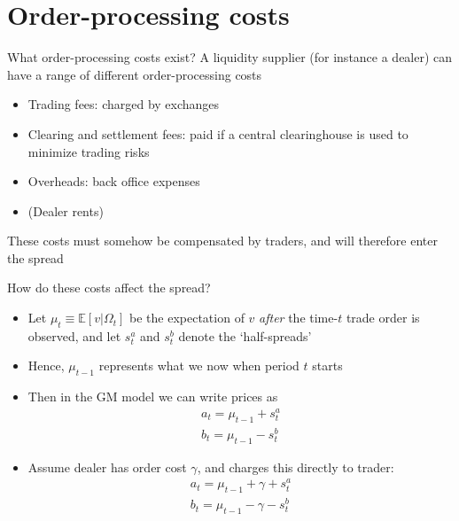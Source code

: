 \documentclass[english,10pt]{beamer}
\begin{document}
\section{Order-processing costs}

\begin{frame}{What order-processing costs exist?}
	A liquidity supplier (for instance a dealer) can have a range of different order-processing costs
	\begin{itemize}
		\item Trading fees:  charged by exchanges
		\item Clearing and settlement fees:  paid if a central clearinghouse is used to minimize trading risks
		\item Overheads: back office expenses
		\item (Dealer rents)
	\end{itemize}
	These costs must somehow be compensated by traders, and will therefore enter the spread
\end{frame}


\begin{frame}{How do these costs affect the spread?}
	\begin{itemize}
		\item Let $\mu_t \equiv \mathbb{E}[v | \Omega_t]$ be the expectation of $v$ \textit{after} the time-$t$ trade order is observed, and let $s^a_t$ and $s^b_t$ denote the `half-spreads'
		\item Hence, $\mu_{t-1}$ represents what we now when period $t$ starts
		\item  Then in the GM model  we can write prices as
		\begin{align*}
		a_{t} = \mu_{t-1} +s^{a}_{t} \\
		b_{t} = \mu_{t-1} - s^{b}_{t}
		\end{align*}
		\item Assume dealer has order cost $\gamma$, and charges this directly to trader:
		\begin{align*}
		a_{t} = \mu_{t-1} + \gamma + s^{a}_{t} \\
		b_{t} = \mu_{t-1} - \gamma - s^{b}_{t}
		\end{align*}
	\end{itemize}
\end{frame}
\end{document}
